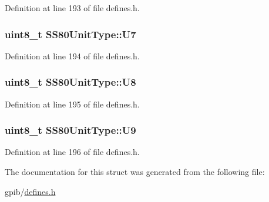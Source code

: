 Definition at line 193 of file defines.\+h.

\subsubsection[{\texorpdfstring{U7}{U7}}]{\setlength{\rightskip}{0pt plus 5cm}uint8\+\_\+t S\+S80\+Unit\+Type\+::\+U7}\hypertarget{structSS80UnitType_a7b2386c546a650681e1b91215b06a42a}{}\label{structSS80UnitType_a7b2386c546a650681e1b91215b06a42a}


Definition at line 194 of file defines.\+h.

\subsubsection[{\texorpdfstring{U8}{U8}}]{\setlength{\rightskip}{0pt plus 5cm}uint8\+\_\+t S\+S80\+Unit\+Type\+::\+U8}\hypertarget{structSS80UnitType_a9179b2db6d9a77eb6fa614e8144ed4e2}{}\label{structSS80UnitType_a9179b2db6d9a77eb6fa614e8144ed4e2}


Definition at line 195 of file defines.\+h.

\subsubsection[{\texorpdfstring{U9}{U9}}]{\setlength{\rightskip}{0pt plus 5cm}uint8\+\_\+t S\+S80\+Unit\+Type\+::\+U9}\hypertarget{structSS80UnitType_a8db227e978903c9ae3923225b86c0609}{}\label{structSS80UnitType_a8db227e978903c9ae3923225b86c0609}


Definition at line 196 of file defines.\+h.



The documentation for this struct was generated from the following file\+:\begin{DoxyCompactItemize}
\item 
gpib/\hyperlink{defines_8h}{defines.\+h}\end{DoxyCompactItemize}
